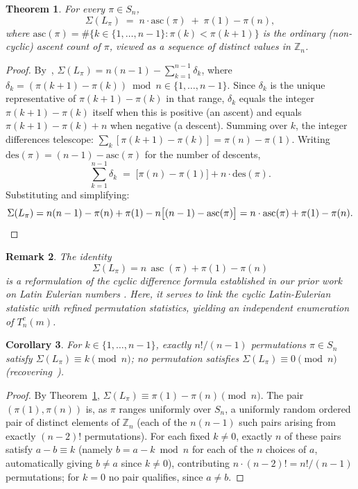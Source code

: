\documentclass[11pt,a4paper]{amsart}
\newtheorem{theorem}{Theorem}[section]
\newtheorem{corollary}[theorem]{Corollary}
\newtheorem{remark}[theorem]{Remark}
\newcommand{\Z}{\mathbb{Z}}
\newcommand{\asc}{\operatorname{asc}}
\newcommand{\1}{\mathbf{1}}
\begin{document}
\begin{theorem}\label{thm:reduction}
For every $\pi\in S_n$,
\[
\Sigma(L_\pi) \;=\; n\cdot\mathrm{asc}(\pi) \;+\; \pi(1)-\pi(n),
\]
where $\mathrm{asc}(\pi)=\#\{k\in\{1,\dots,n-1\}:\pi(k)<\pi(k+1)\}$ is the ordinary (non-cyclic) ascent count of $\pi$, viewed as a sequence of distinct values in $\Z_n$.
\end{theorem}
\begin{proof}
By~\cite[Prop.~4.5]{LEN}, $\Sigma(L_\pi)=n(n-1)-\sum_{k=1}^{n-1}\delta_k$, where $\delta_k=(\pi(k{+}1)-\pi(k))\bmod n\in\{1,\dots,n-1\}$. Since $\delta_k$ is the unique representative of $\pi(k{+}1)-\pi(k)$ in that range, $\delta_k$ equals the integer $\pi(k{+}1)-\pi(k)$ itself when this is positive (an ascent) and equals $\pi(k{+}1)-\pi(k)+n$ when negative (a descent). Summing over $k$, the integer differences telescope: $\sum_k[\pi(k{+}1)-\pi(k)]=\pi(n)-\pi(1)$. Writing $\mathrm{des}(\pi)=(n{-}1)-\mathrm{asc}(\pi)$ for the number of descents,
\[
\sum_{k=1}^{n-1}\delta_k \;=\; \bigl[\pi(n)-\pi(1)\bigr] + n\cdot\mathrm{des}(\pi).
\]
Substituting and simplifying:
\[
\Sigma(L_\pi) = n(n-1) - \pi(n)+\pi(1) - n\bigl[(n-1)-\mathrm{asc}(\pi)\bigr] = n\cdot\mathrm{asc}(\pi)+\pi(1)-\pi(n). \qedhere
\]
\end{proof}
\begin{remark}\label{rem:endpoint-identity}
The identity
\[
\Sigma(L_\pi) = n\,\asc(\pi) + \pi(1) - \pi(n)
\]
is a reformulation of the cyclic difference formula established in our prior work on Latin Eulerian numbers \cite[Prop.~4.5]{LEN}. Here, it serves to link the cyclic Latin-Eulerian statistic with refined permutation statistics, yielding an independent enumeration of $T_n^c(m)$.
\end{remark}
\begin{corollary}\label{cor:mod-n-exact}
For $k\in\{1,\dots,n-1\}$, exactly $n!/(n-1)$ permutations $\pi\in S_n$ satisfy $\Sigma(L_\pi)\equiv k\pmod n$; no permutation satisfies $\Sigma(L_\pi)\equiv0\pmod n$ (recovering~\cite[Prop.~4.6]{LEN}).

\end{corollary}
\begin{proof}
By Theorem~\ref{thm:reduction}, $\Sigma(L_\pi)\equiv\pi(1)-\pi(n)\pmod n$. The pair $(\pi(1),\pi(n))$ is, as $\pi$ ranges uniformly over $S_n$, a uniformly random ordered pair of distinct elements of $\Z_n$ (each of the $n(n-1)$ such pairs arising from exactly $(n-2)!$ permutations). For each fixed $k\ne0$, exactly $n$ of these pairs satisfy $a-b\equiv k$ (namely $b=a-k\bmod n$ for each of the $n$ choices of $a$, automatically giving $b\ne a$ since $k\ne0$), contributing $n\cdot(n-2)!=n!/(n-1)$ permutations; for $k=0$ no pair qualifies, since $a\ne b$.
\end{proof}
\end{document}
